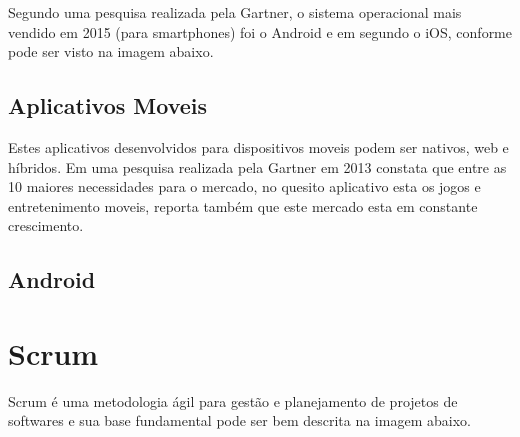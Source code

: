 Segundo uma pesquisa realizada pela Gartner, o sistema operacional mais vendido em 2015 (para smartphones) foi o Android e em segundo o iOS, conforme pode ser visto na imagem abaixo.
\begin{figure}[h!]
		\centering
	\end{figure}

\subsection{Aplicativos Moveis}


Estes aplicativos desenvolvidos para dispositivos moveis podem ser nativos, web e híbridos. Em uma pesquisa realizada pela Gartner em 2013 constata que entre as 10 maiores necessidades para o mercado, no quesito aplicativo esta os jogos e entretenimento moveis, reporta também que este mercado esta em constante crescimento.

\subsection{Android}

\section{Scrum}
\label{sec:scrum}

Scrum é uma metodologia ágil para gestão e planejamento de projetos de softwares e sua base fundamental pode ser bem descrita na imagem abaixo.

